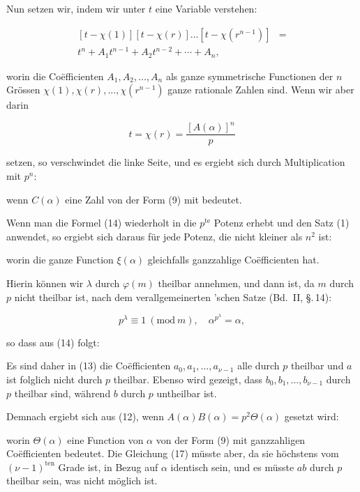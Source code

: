 Nun setzen wir, indem wir unter $t$ eine Variable verstehen:

\[
\begin{aligned}
{}[t - \chi(1)][t - \chi(r)] \ldots [t - \chi(r^{n-1})] &= \\
t^n + A_1t^{n-1} + A_2t^{n-2} + \cdots + A_n, &
\end{aligned}
\]

worin die Coëfficienten $A_1, A_2, \ldots, A_n$ als ganze symmetrische Functionen der $n$ Grössen $\chi(1), \chi(r), \ldots, \chi(r^{n-1})$ ganze rationale Zahlen sind. Wenn wir aber darin

\[
t = \chi(r) = \dfrac{[A(\alpha)]^n}{p}
\]

setzen, so verschwindet die linke Seite, und es ergiebt sich durch Multiplication mit $p^n$:


wenn $C(\alpha)$ eine Zahl von der Form (9) mit  bedeutet.

Wenn man die Formel (14) wiederholt in die $p^{\text{te}}$ Potenz erhebt und den Satz (1) anwendet, so ergiebt sich daraus für jede Potenz, die nicht kleiner als $n^2$ ist:


worin die ganze Function $\xi(\alpha)$ gleichfalls ganzzahlige Coëfficienten hat.

Hierin können wir $\lambda$ durch $\varphi(m)$ theilbar annehmen, und dann ist, da $m$ durch $p$ nicht theilbar ist, nach dem verallgemeinerten 'schen Satze (Bd.~II, \S.\,14):

\[
p^\lambda \equiv 1 \ (\mathrm{mod}\ m), \quad \alpha^{p^\lambda} = \alpha,
\]

so dass aus (14) folgt: %


Es sind daher in (13) die Coëfficienten $a_0, a_1, \ldots, a_{\nu-1}$ alle durch $p$ theilbar und $a$ ist folglich nicht durch $p$ theilbar. Ebenso wird gezeigt, dass $b_0, b_1, \ldots, b_{\nu-1}$ durch $p$ theilbar sind, während $b$ durch $p$ untheilbar ist.

Demnach ergiebt sich aus (12), wenn $A(\alpha)B(\alpha) = p^2\Theta(\alpha)$ gesetzt wird:


worin $\Theta(\alpha)$ eine Function von $\alpha$ von der Form (9) mit ganzzahligen Coëfficienten bedeutet. Die Gleichung (17) müsste aber, da sie höchstens vom $(\nu-1)^{\text{ten}}$ Grade ist, in Bezug auf $\alpha$ identisch sein, und es müsste $ab$ durch $p$ theilbar sein, was nicht möglich ist.
